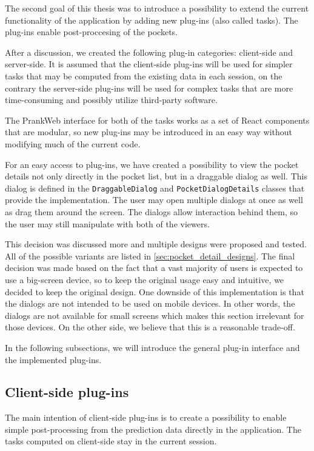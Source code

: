 The second goal of this thesis was to introduce a possibility to extend the current functionality of the application by adding new plug-ins (also called tasks). The plug-ins enable post-proccesing of the pockets. 

After a discussion, we created the following plug-in categories: client-side and server-side. It is assumed that the client-side plug-ins will be used for simpler tasks that may be computed from the existing data in each session, on the contrary the server-side plug-ins will be used for complex tasks that are more time-consuming and possibly utilize third-party software.

The PrankWeb interface for both of the tasks works as a set of React components that are modular, so new plug-ins may be introduced in an easy way without modifying much of the current code.

For an easy access to plug-ins, we have created a possibility to view the pocket details not only directly in the pocket list, but in a draggable dialog as well. This dialog is defined in the \texttt{DraggableDialog} and \texttt{PocketDialogDetails} classes that provide the implementation. The user may open multiple dialogs at once as well as drag them around the screen. The dialogs allow interaction behind them, so the user may still manipulate with both of the viewers.

This decision was discussed more and multiple designs were proposed and tested. All of the possible variants are listed in \cref{sec:pocket_detail_designs}. The final decision was made based on the fact that a vast majority of users is expected to use a big-screen device, so to keep the original usage easy and intuitive, we decided to keep the original design. One downside of this implementation is that the dialogs are not intended to be used on mobile devices. In other words, the dialogs are not available for small screens which makes this section irrelevant for those devices. On the other side, we believe that this is a reasonable trade-off.

In the following subsections, we will introduce the general plug-in interface and the implemented plug-ins.

\subsection{Client-side plug-ins}
\label{subsec:client-side-plugins}

The main intention of client-side plug-ins is to create a possibility to enable simple post-processing from the prediction data directly in the application. The tasks computed on client-side stay in the current session. 

